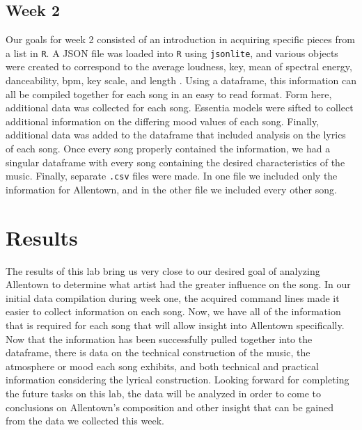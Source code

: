 \documentclass{article}\usepackage[]{graphicx}\usepackage[]{xcolor}
\begin{document}
\begin{multicols}{2}
\subsection{Week 2}
Our goals for week 2 consisted of an introduction in acquiring specific pieces from a list in \texttt{R}. A JSON file was loaded into \texttt{R} using \texttt{jsonlite}, and various objects were created to correspond to the average loudness, key, mean of spectral energy, danceability, bpm, key scale, and length \citep{jsonlite}. Using a dataframe, this information can all be compiled together for each song in an easy to read format. Form here, additional data was collected for each song. Essentia models were sifted to collect additional information on the differing mood values of each song. Finally, additional data was added to the dataframe that included analysis on the lyrics of each song. Once every song properly contained the information, we had a singular dataframe with every song containing the desired characteristics of the music. Finally, separate \texttt{.csv} files were made. In one file we included only the information for Allentown, and in the other file we included every other song. 

\section{Results}
The results of this lab bring us very close to our desired goal of analyzing Allentown to determine what artist had the greater influence on the song. In our initial data compilation during week one, the acquired command lines made it easier to collect information on each song. Now, we have all of the information that is required for each song that will allow insight into Allentown specifically. Now that the information has been successfully pulled together into the dataframe, there is data on the technical construction of the music, the atmosphere or mood each song exhibits, and both technical and practical information considering the lyrical construction. Looking forward for completing the future tasks on this lab, the data will be analyzed in order to come to conclusions on Allentown's composition and other insight that can be gained from the data we collected this week.







\end{multicols}
\end{document}
